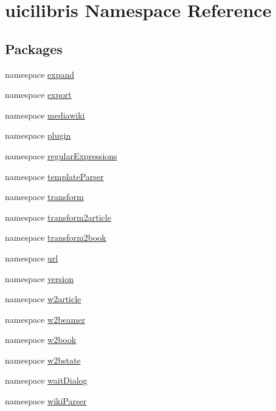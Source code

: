 \hypertarget{namespaceuicilibris}{\section{uicilibris \-Namespace \-Reference}
\label{namespaceuicilibris}
}
\subsection*{\-Packages}
\begin{DoxyCompactItemize}
\item 
namespace \hyperlink{namespaceuicilibris_1_1expand}{expand}
\item 
namespace \hyperlink{namespaceuicilibris_1_1export}{export}
\item 
namespace \hyperlink{namespaceuicilibris_1_1mediawiki}{mediawiki}
\item 
namespace \hyperlink{namespaceuicilibris_1_1plugin}{plugin}
\item 
namespace \hyperlink{namespaceuicilibris_1_1regularExpressions}{regular\-Expressions}
\item 
namespace \hyperlink{namespaceuicilibris_1_1templateParser}{template\-Parser}
\item 
namespace \hyperlink{namespaceuicilibris_1_1transform}{transform}
\item 
namespace \hyperlink{namespaceuicilibris_1_1transform2article}{transform2article}
\item 
namespace \hyperlink{namespaceuicilibris_1_1transform2book}{transform2book}
\item 
namespace \hyperlink{namespaceuicilibris_1_1url}{url}
\item 
namespace \hyperlink{namespaceuicilibris_1_1version}{version}
\item 
namespace \hyperlink{namespaceuicilibris_1_1w2article}{w2article}
\item 
namespace \hyperlink{namespaceuicilibris_1_1w2beamer}{w2beamer}
\item 
namespace \hyperlink{namespaceuicilibris_1_1w2book}{w2book}
\item 
namespace \hyperlink{namespaceuicilibris_1_1w2bstate}{w2bstate}
\item 
namespace \hyperlink{namespaceuicilibris_1_1waitDialog}{wait\-Dialog}
\item 
namespace \hyperlink{namespaceuicilibris_1_1wikiParser}{wiki\-Parser}
\end{DoxyCompactItemize}
